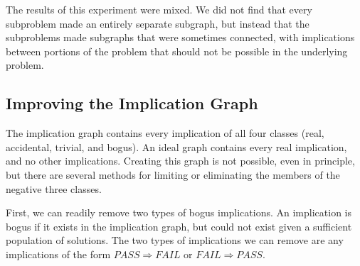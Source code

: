 \documentclass[11pt,twoside]{article}
\newcommand\fail{\mathit{FAIL}}
\newcommand\pass{\mathit{PASS}}
\theoremstyle{definition}
\begin{document}

The results of this experiment were mixed. We did not find that every subproblem made an entirely separate subgraph, but instead that the subproblems made subgraphs that were sometimes connected, with implications between portions of the problem that should not be possible in the underlying problem.

\subsection{Improving the Implication Graph}

The implication graph contains every implication of all four classes (real, accidental, trivial, and bogus). An ideal graph contains every real implication, and no other implications. Creating this graph is not possible, even in principle, but there are several methods for limiting or eliminating the members of the negative three classes.

First, we can readily remove two types of bogus implications. An implication is bogus if it exists in the implication graph, but could not exist given a sufficient population of solutions. The two types of implications we can remove are any implications of the form $\pass\Rightarrow\fail$ or $\fail\Rightarrow\pass$.
\end{document}
